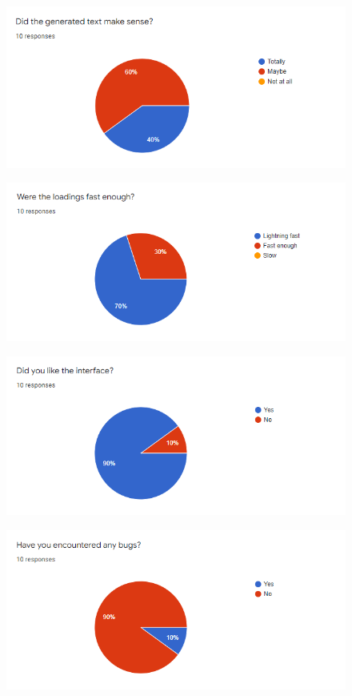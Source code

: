 \documentclass[12pt]{report}
\begin{document}
\begin{appendices}
\begin{figure}[ht]
  \centering
  \includegraphics[width=.8\linewidth]{img/feedback0.png}
  \label{fig:feedback0}
\end{figure}
\begin{figure}[ht]
  \centering
  \includegraphics[width=.8\linewidth]{img/feedback1.png}
  \label{fig:feedback1}
\end{figure}
\begin{figure}[ht]
  \centering
  \includegraphics[width=.8\linewidth]{img/feedback2.png}
  \label{fig:feedback2}
\end{figure}
\begin{figure}[ht]
  \centering
  \includegraphics[width=.8\linewidth]{img/feedback3.png}

\end{figure}
\end{appendices}
\end{document}

